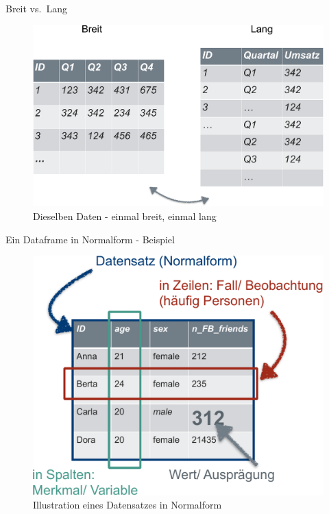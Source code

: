 \begin{frame}{Breit vs.~Lang}

\begin{figure}

{\centering \includegraphics[width=0.8\linewidth]{../images/tidy/breit_lang} 

}

\caption{Dieselben Daten - einmal breit, einmal lang}\label{fig:lang-breit}
\end{figure}

\end{frame}

\begin{frame}{Ein Dataframe in Normalform - Beispiel}

\begin{figure}

{\centering \includegraphics[width=0.4\linewidth]{../images/tidy/Normalform} 

}

\caption{Illustration eines Datensatzes in Normalform}\label{fig:fig-Normalform}
\end{figure}

\end{frame}


